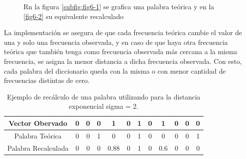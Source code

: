 \begin{figure}[ht]
	\centering
	\caption{Rn la figura \ref{subfig:fig6-1} se grafica una palabra teórica y en la \ref{fig6-2} su equivalente recalculado}
\end{figure}

La implementación se asegura de que cada frecuencia teórica cambie el valor de una y solo una frecuencia observada, y en caso de que haya otra frecuencia teórica que también tenga como frecuencia observada más cercana a la misma frecuencia, se asigna la menor distancia a dicha frecuencia observada. Con esto, cada palabra del diccionario queda con la misma o con menor cantidad de frecuencias distintas de cero.

\begin {table}[H]
\begin{center}
	\begin{tabular}{|c|c|c|c|c|c|c|c|c|c|c|c|}
		\hline Vector Obervado     & 0 & 0 &  0 &  1    & 0 &  1 & 0 & 1   & 0 & 0 & 0 \\ 
		\hline Palabra Teórica     & 0 & 0 &  1 &  0    & 0 &  1 & 0 & 0   & 0 & 0 & 1 \\ 
		\hline Palabra Recalculada & 0 & 0 &  0 &  0.88 & 0 &  1 & 0 & 0.6 & 0 & 0 & 0 \\ 
		\hline
	\end{tabular}
	\caption {Ejemplo de recálculo de una palabra utilizando para la distancia exponencial sigma = 2.}
\end{center}
\end{table}

